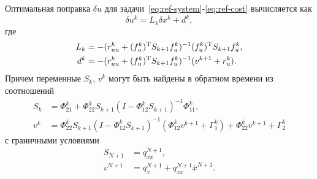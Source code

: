 \documentclass[../../doc.tex]{subfiles}
\begin{document}
    \begin{theorem}
        Оптимальная поправка $\delta u$ для задачи~\eqref{eq:ref-system}-\eqref{eq:ref-cost} вычисляется как
        \begin{equation}\label{eq:method-optimal-control-result}
            \delta u^k = L_k \delta x^k + d^k,
        \end{equation}
        где
        \begin{equation*}
            \begin{aligned}
                L_k &= - (r^k_{uu} + (f^k_u)^\textnormal{T} S_{k+1} f^k_u)^{-1} (f^k_u)^\textnormal{T} S_{k+1} f^k_u,
                \\
                d^k &= - (r^k_{uu} + (f^k_u)^\textnormal{T} S_{k+1} f^k_u)^{-1} (v^{k+1} + r^k_u).
            \end{aligned}
        \end{equation*}
        Причем переменные $S_k$, $v^{k}$ могут быть найдены в обратном времени из соотношений
        \begin{equation}\label{eq:method-s-v-result}
            \begin{aligned}
                S_k &= \Phi^k_{21} + \Phi^k_{22} S_{k+1} (I - \Phi^k_{12}S_{k+1})^{-1} \Phi^k_{11},
                \\
                v^k &= \Phi^k_{22} S_{k+1} ( I - \Phi^k_{12} S_{k+1})^{-1} (\Phi^k_{12} v^{k+1} + \Gamma^k_1) + \Phi^k_{22} v^{k+1} + \Gamma^k_2
            \end{aligned}
        \end{equation}
        с граничными условиями
        \begin{equation}\label{eq:method-s-v-boundary-result}
            \begin{aligned}
                S_{N+1} &= q^{N+1}_{xx},
                \\
                v^{N+1} &= q^{N+1}_{x} + q^{N+1}_{xx}\bar x^{N+1}.
            \end{aligned}
        \end{equation}
    \end{theorem}
    
\end{document}
